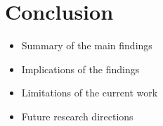 \section{Conclusion}\label{sec:conclusion}

\begin{itemize}
    \item Summary of the main findings
    \item Implications of the findings
    \item Limitations of the current work
    \item Future research directions
\end{itemize}

\newpage
